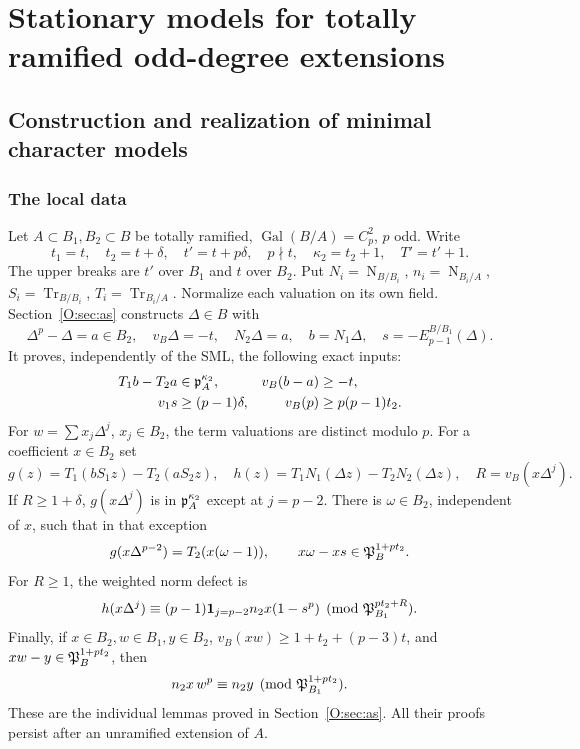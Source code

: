 \documentclass[11pt]{amsart}
\theoremstyle{definition}
\theoremstyle{remark}
\newcommand{\Tr}{\operatorname{Tr}}
\newcommand{\Nm}{\operatorname{N}}
\newcommand{\Gal}{\operatorname{Gal}}
\begin{document}
\section{Stationary models for totally ramified odd-degree extensions}\label{sec:odd-models}
\subsection{Construction and realization of minimal character models}\label{O:sec:models}
\subsubsection*{The local data}
Let $A\subset B_1,B_2\subset B$ be totally ramified, $\Gal(B/A)=C_p^2$,
$p$ odd. Write
\[
 t_1=t,\quad t_2=t+\delta,\quad t'=t+p\delta,\quad p\nmid t,
 \quad \kappa_2=t_2+1,\quad T'=t'+1.
\]
The upper breaks are $t'$ over $B_1$ and $t$ over $B_2$. Put
$N_i=\Nm_{B/B_i}$, $n_i=\Nm_{B_i/A}$, $S_i=\Tr_{B/B_i}$,
$T_i=\Tr_{B_i/A}$. Normalize each valuation on its own field.
Section~\ref{O:sec:as} constructs $\Delta\in B$ with
\[
 \Delta^p-\Delta=a\in B_2,\quad v_B\Delta=-t,\quad
 N_2\Delta=a,\quad b=N_1\Delta,\quad s=-E_{p-1}^{B/B_1}(\Delta).
\]
It proves, independently of the SML, the following exact inputs:
\begin{align}
 T_1b-T_2a&\in\mathfrak p_A^{\kappa_2}, &v_B(b-a)&\ge-t,                 \label{O:M:H14}\\
 v_1s&\ge(p-1)\delta, &v_B(p)&\ge p(p-1)t_2.              \label{O:M:basic}
\end{align}
For $w=\sum x_j\Delta^j$, $x_j\in B_2$, the term valuations are distinct
modulo $p$. For a coefficient $x\in B_2$ set
\[
 g(z)=T_1(bS_1z)-T_2(aS_2z),\quad
 h(z)=T_1N_1(\Delta z)-T_2N_2(\Delta z),\quad R=v_B(x\Delta^j).
\]
If $R\ge1+\delta$, $g(x\Delta^j)$ is in $\mathfrak p_A^{\kappa_2}$ except at $j=p-2$.
There is $\omega\in B_2$, independent of $x$, such that in that exception
\begin{equation}\label{O:M:ginput}
 g(x\Delta^{p-2})=T_2(x(\omega-1)),\qquad
 x\omega-xs\in\mathfrak P_B^{1+pt_2}.
\end{equation}
For $R\ge1$, the weighted norm defect is
\begin{equation}\label{O:M:hinput}
 h(x\Delta^j)\equiv(p-1)\mathbf1_{j=p-2}n_2x(1-s^p)
       \pmod{\mathfrak P_{B_1}^{pt_2+R}}.
\end{equation}
Finally, if $x\in B_2,w\in B_1,y\in B_2$,
$v_B(xw)\ge1+t_2+(p-3)t$, and $xw-y\in\mathfrak P_B^{1+pt_2}$, then
\begin{equation}\label{O:M:transferinput}
 n_2x\,w^p\equiv n_2y\pmod{\mathfrak P_{B_1}^{1+pt_2}}.
\end{equation}
These are the individual lemmas proved in Section~\ref{O:sec:as}.
All their proofs persist after an unramified extension of $A$.
\end{document}
